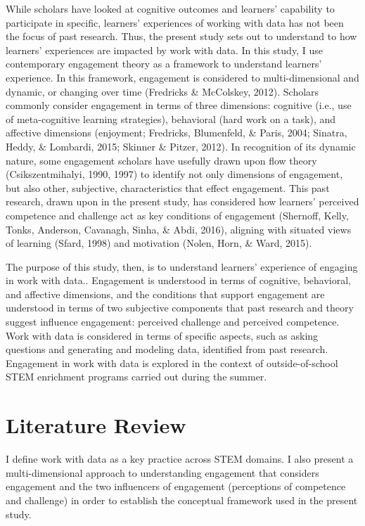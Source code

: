 \documentclass[]{msu-thesis}
\theoremstyle{definition}
\theoremstyle{definition}
\theoremstyle{definition}
\theoremstyle{remark}
\begin{document}
While scholars have looked at cognitive outcomes and learners'
capability to participate in specific, learners' experiences of working
with data has not been the focus of past research. Thus, the present
study sets out to understand to how learners' experiences are impacted
by work with data. In this study, I use contemporary engagement theory
as a framework to understand learners' experience. In this framework,
engagement is considered to multi-dimensional and dynamic, or changing
over time (Fredricks \& McColskey, 2012). Scholars commonly consider
engagement in terms of three dimensions: cognitive (i.e., use of
meta-cognitive learning strategies), behavioral (hard work on a task),
and affective dimensions (enjoyment; Fredricks, Blumenfeld, \& Paris,
2004; Sinatra, Heddy, \& Lombardi, 2015; Skinner \& Pitzer, 2012). In
recognition of its dynamic nature, some engagement scholars have
usefully drawn upon flow theory (Csikszentmihalyi, 1990, 1997) to
identify not only dimensions of engagement, but also other, subjective,
characteristics that effect engagement. This past research, drawn upon
in the present study, has considered how learners' perceived competence
and challenge act as key conditions of engagement (Shernoff, Kelly,
Tonks, Anderson, Cavanagh, Sinha, \& Abdi, 2016), aligning with situated
views of learning (Sfard, 1998) and motivation (Nolen, Horn, \& Ward,
2015).

The purpose of this study, then, is to understand learners' experience
of engaging in work with data.. Engagement is understood in terms of
cognitive, behavioral, and affective dimensions, and the conditions that
support engagement are understood in terms of two subjective components
that past research and theory suggest influence engagement: perceived
challenge and perceived competence. Work with data is considered in
terms of specific aspects, such as asking questions and generating and
modeling data, identified from past research. Engagement in work with
data is explored in the context of outside-of-school STEM enrichment
programs carried out during the summer.

\chapter{Literature Review}\label{literature-review}

I define work with data as a key practice across STEM domains. I also
present a multi-dimensional approach to understanding engagement that
considers engagement and the two influencers of engagement (perceptions
of competence and challenge) in order to establish the conceptual
framework used in the present study.
\end{document}
